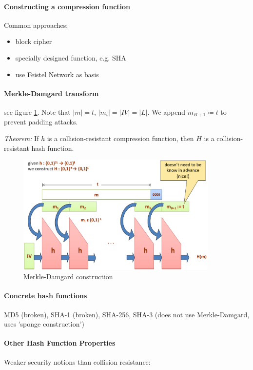 \paragraph{Constructing a compression function} Common approaches:

\begin{itemize}
    \item block cipher
    \item specially designed function, e.g. SHA
    \item use Feistel Network as basis
\end{itemize}

\paragraph{Merkle-Damgard transform} see figure \ref{fig:damgard-merkle}. Note that $|m| = t$, $|m_i| = |IV| = |L|$. We append $m_{B+1} \coloneqq t$ to prevent padding attacks.

\textit{Theorem:} If $h$ is a collision-resistant compression function, then $H$ is a collision-resistant hash function.

\begin{figure}[h]
    \centering
    \includegraphics[width=10cm]{images/ch4-damgard-merkle.png}
    \caption{Merkle-Damgard construction}
    \label{fig:damgard-merkle}
\end{figure}

\paragraph{Concrete hash functions} MD5 (broken), SHA-1 (broken), SHA-256, SHA-3 (does not use Merkle-Damgard, uses 'sponge construction') 

\paragraph{Other Hash Function Properties} Weaker security notions than collision
resistance:

